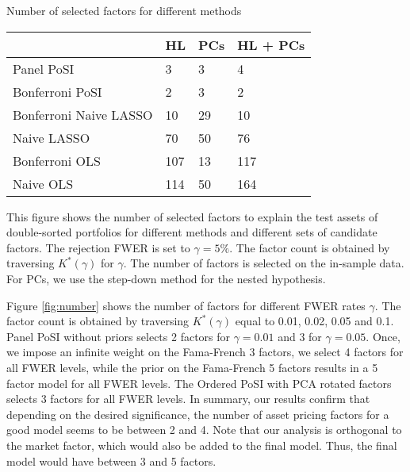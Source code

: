 \documentclass[11pt]{article}
\newcommand\tcaptab[1]{\captionsetup{position=top, font=normalsize, labelfont=bf, textfont=normalfont, justification=centering, margin=0mm, aboveskip=1mm, belowskip=0mm, labelsep=colon, singlelinecheck=false}\caption{#1}}
\newcommand\bnotetab[1]{\captionsetup{position=bottom, font=footnotesize,  textfont=normalfont, margin=1mm, skip=2mm, justification=justified, singlelinecheck=false}\caption*{#1}}
\begin{document}
\begin{table}[t!]
	\tcaptab{Number of selected factors for different methods}
	\label{tab:number}
	\centering
	{\small
			\renewcommand{\arraystretch}{1.2}
			\begin{tabular}{@{}llll@{}}
				\toprule
				& HL & PCs   & HL + PCs  \\ \midrule
				Panel PoSI             & 3   & 3    & 4 \\
				Bonferroni PoSI        & 2   & 3    & 2 \\
				Bonferroni Naive LASSO & 10  & 29   & 10 \\
				Naive LASSO            & 70  & 50  &76 \\
				Bonferroni OLS         & 107 & 13 & 117 \\
				Naive OLS              & 114 & 50  & 164\\                  
				\bottomrule
			\end{tabular}
		}
		\bnotetab{
			This figure shows the number of selected factors to explain the test assets of double-sorted portfolios for different methods and different sets of candidate factors. The rejection FWER is set to $\gamma=5\%$. The factor count is obtained by traversing $K^*(\gamma)$ for $\gamma$. The number of factors is selected on the in-sample data. For PCs, we use the step-down method for the nested hypothesis. 
		}
	\end{table}
	
	
	
	Figure \ref{fig:number} shows the number of factors for different FWER rates $\gamma$. The factor count is obtained by traversing $K^*(\gamma)$ equal to 0.01, 0.02, 0.05 and 0.1. Panel PoSI without priors selects 2 factors for $\gamma=0.01$ and 3 for $\gamma=0.05$. Once, we impose an infinite weight on the Fama-French 3 factors, we select 4 factors for all FWER levels, while the prior on the Fama-French 5 factors results in a 5 factor model for all FWER levels. The Ordered PoSI with PCA rotated factors selects 3 factors for all FWER levels. In summary, our results confirm that depending on the desired significance, the number of asset pricing factors for a good model seems to be between 2 and 4. Note that our analysis is orthogonal to the market factor, which would also be added to the final model. Thus, the final model would have between 3 and 5 factors.
	
	
	
\end{document}
